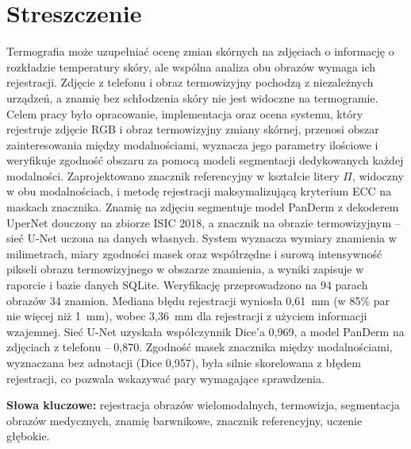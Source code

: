 
\chapter*{Streszczenie}

Termografia może uzupełniać ocenę zmian skórnych na zdjęciach o informację o rozkładzie temperatury skóry, ale wspólna analiza obu obrazów wymaga ich rejestracji. Zdjęcie z telefonu i obraz termowizyjny pochodzą z niezależnych urządzeń, a znamię bez schłodzenia skóry nie jest widoczne na termogramie. Celem pracy było opracowanie, implementacja oraz ocena systemu, który rejestruje zdjęcie RGB i obraz termowizyjny zmiany skórnej, przenosi obszar zainteresowania między modalnościami, wyznacza jego parametry ilościowe i weryfikuje zgodność obszaru za pomocą modeli segmentacji dedykowanych każdej modalności. Zaprojektowano znacznik referencyjny w kształcie litery $\Pi$, widoczny w obu modalnościach, i metodę rejestracji maksymalizującą kryterium ECC na maskach znacznika. Znamię na zdjęciu segmentuje model PanDerm z dekoderem UperNet douczony na zbiorze ISIC 2018, a znacznik na obrazie termowizyjnym -- sieć U-Net uczona na danych własnych. System wyznacza wymiary znamienia w milimetrach, miary zgodności masek oraz współrzędne i surową intensywność pikseli obrazu termowizyjnego w obszarze znamienia, a wyniki zapisuje w raporcie i bazie danych SQLite. Weryfikację przeprowadzono na 94 parach obrazów 34 znamion. Mediana błędu rejestracji wyniosła 0,61~mm (w 85\% par nie więcej niż 1~mm), wobec 3,36~mm dla rejestracji z użyciem informacji wzajemnej. Sieć U-Net uzyskała współczynnik Dice'a 0,969, a model PanDerm na zdjęciach z telefonu -- 0,870. Zgodność masek znacznika między modalnościami, wyznaczana bez adnotacji (Dice 0,957), była silnie skorelowana z błędem rejestracji, co pozwala wskazywać pary wymagające sprawdzenia.

\vspace{1em}
\noindent\textbf{Słowa kluczowe:} rejestracja obrazów wielomodalnych, termowizja, segmentacja obrazów medycznych, znamię barwnikowe, znacznik referencyjny, uczenie głębokie.

